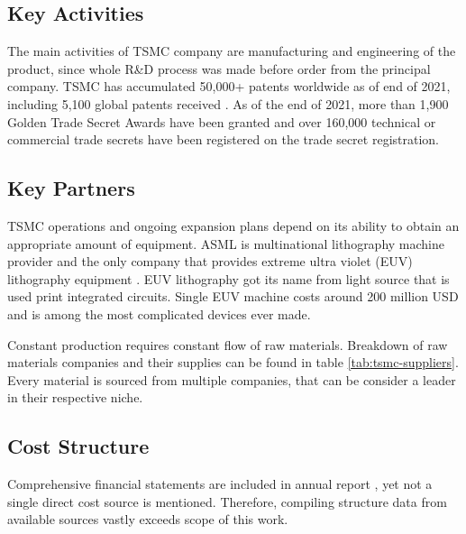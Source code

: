 \documentclass[a4paper,12pt]{article}
\begin{document}





\subsection{Key Activities}
The main activities of TSMC company are manufacturing and engineering of the product, since whole R\&D process was made before order from the principal company.
TSMC has accumulated 50,000+ patents worldwide as of end of 2021, including 5,100 global patents received \cite{TSMCAnnualReport}.
As of the end of 2021, more than 1,900 Golden Trade Secret Awards have been granted and over 160,000 technical or commercial trade secrets have been registered on the trade secret registration.

\subsection{Key Partners}
TSMC operations and ongoing expansion plans depend on its ability to obtain an appropriate amount of equipment.
ASML is multinational lithography machine provider and the only company that provides extreme ultra violet (EUV) lithography equipment \cite{InsideASML}.
EUV lithography got its name from light source that is used print integrated circuits.
Single EUV machine costs around 200 million USD and is among the most complicated devices ever made.

Constant production requires constant flow of raw materials.
Breakdown of raw materials companies and their supplies can be found in table \ref{tab:tsmc-suppliers}. 
Every material is sourced from multiple companies, that can be consider a leader in their respective niche. 

\subsection{Cost Structure}

Comprehensive financial statements are included in annual report \cite{TSMCAnnualReport}, yet not a single direct cost source is mentioned. 
Therefore, compiling structure data from available sources vastly exceeds scope of this work. 
\end{document}
